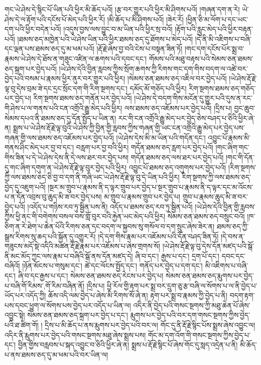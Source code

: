 གང་ཡེ་ཤེས་དེ་སྙིང་པོ་ཡིན་པའི་ཕྱིར་མི་ཆོད་པའོ། །རྩ་བར་གྱུར་པའི་ཕྱིར་མི་ཤིགས་པའོ། །གཞན་དག་ན་རེ། ཡེ་ཤེས་དེ་ལ་རྟོག་པའི་དངོས་པོ་མེད་པའི་ཕྱིར་རོ། །མི་ཆོད་པ་མི་ཤིགས་པའོ། །ཟེར་རོ། །ཕྱིན་ཅི་མ་ལོག་པ་དང་ཡང་དག་པའི་ཕྱིར་བདེན་པའོ། །འདུས་བྱས་ལས་བྱུང་བ་མ་ཡིན་པའི་ཕྱིར་སྲ་བའོ། །རྟོག་པའི་རླུང་མེད་པའི་ཕྱིར་བརྟན་པའོ། །ཐམས་ཅད་མཁྱེན་པའི་ཡེ་ཤེས་ཡིན་པའི་ཕྱིར་ཐམས་ཅད་དུ་ཐོགས་པ་མེད་པའོ། །དེ་ནི་མི་འཇིགས་པ་བཞི་དང་ལྡན་པས་ཐམས་ཅད་དུ་མ་ཕམ་པའོ། །རྡོ་རྗེ་ཞེས་བྱ་བའི་ངེས་པ་བསྟན་ཟིན་ཏོ། །གང་དག་དངོས་པོར་སྨྲ་བ་རྣམས་ཡེ་ཤེས་དེ་ཐོས་ན་གཟུང་འཛིན་ལ་ཆགས་པའི་དབང་དང་། གོམས་པའི་མཐུ་བརྟས་པའི་སེམས་ཅན་ཐམས་ཅད་སྐྲག་པར་བྱེད་པའོ། །ཡེ་ཤེས་དེའི་བྱིན་རླབས་ཀྱིས་སྲོག་ཆགས་ཀྱི་རིགས་གང་དག་གིས་བདག་ལ་འཚེ་བར་བྱེད་པའི་བསམ་པ་རྣམས་ཕྱིར་ནུར་བར་གྱུར་པའི་ཕྱིར། །སེམས་ཅན་ཐམས་ཅད་འཇིལ་བར་བྱེད་པའོ། །ཡེ་ཤེས་རྡོ་རྗེ་ལྟ་བུ་དེས་བྲམ་ཟེ་དང་དྲང་སྲོང་དག་གི་རིག་སྔགས་དང་། དམོད་མོ་གཅོད་པའི་ཕྱིར། རིག་སྔགས་ཐམས་ཅད་གཅོད་པར་བྱེད་པ། རིག་སྔགས་ཐམས་ཅད་གནོན་པར་བྱེད་པའོ། །ཡེ་ཤེས་དེ་བདག་གིས་མངོན་དུ་གྱུར་པའི་དུས་ན་རང་གི་ཤེས་པ་ལ་གནས་པའི་ངན་འགྲོའི་རྒྱུ་མེད་པའི་ཕྱིར། ལས་ཐམས་ཅད་འཇོམས་པར་བྱེད་པའོ། །དྲིས་པ། བྱང་ཆུབ་སེམས་དཔའ་ནི་ཐམས་ཅད་དུ་དོན་སྤྱོད་པ་ཡིན་ན། རང་གི་ངན་འགྲོའི་རྒྱུ་མེད་པར་བྱེད་ཅེས་བཤད་པ་ཅིའི་ཕྱིར་ཞེ་ན། སྨྲས་པ་ཡེ་ཤེས་རྡོ་རྗེ་ལྟ་བུའི་ཡེ་ཤེས་ཀྱི་བྱིན་གྱི་རླབས་ཀྱིས་གཞན་གྱི་ཡང་ངན་འགྲོའི་རྒྱུ་མེད་པར་བྱེད་པས་གཞན་གྱི་ལས་ཐམས་ཅད་འཇོམས་པར་བྱེད་པའོ། །ཡེ་ཤེས་དེས་མི་མ་ཡིན་པའི་གདོན་དང་། འབྱུང་པོ་རྣམས་མི་གནས་ཤིང་མེད་པར་བྱ་བ་དང་། བརླག་པར་བྱ་བའི་ཕྱིར། གདོན་ཐམས་ཅད་རླག་པར་བྱེད་པའོ། །གང་ཞིག་གང་གིས་ཟིན་པ་དེ་ཡེ་ཤེས་དེས་ནི་དེ་ལས་ཐར་བར་བྱེད་པས། གདོན་ཐམས་ཅད་ལས་ཐར་པར་བྱེད་པའོ། །གང་གི་དོན་དུ་གང་ཞིག་དགུག་ན་ཡེ་ཤེས་རྡོ་རྗེ་ལྟ་བུར་བྱེད་པའི་ཕྱིར། འབྱུང་པོ་ཐམས་ཅད་འགུགས་པར་བྱེད་པའོ། །རིག་སྔགས་ཀྱི་ལས་ཐམས་ཅད་ཅི་བྱ་བ་དག་ནི་གཞི་ཡང་ཡེ་ཤེས་རྡོ་རྗེ་ལྟ་བུ་དེ་ཡིན་པའི་ཕྱིར། རིག་སྔགས་ཀྱི་ལས་ཐམས་ཅད་བྱེད་དུ་འཇུག་པའོ། །སྔར་མ་གྲུབ་པ་རྣམས་ནི་ད་ལྟར་གྲུབ་པར་བྱེད་པ་སྔར་གྲུབ་པ་རྣམས་ནི་ད་ལྟར་དང་མ་འོངས་པ་ན་དོན་འབྲས་བུ་ཆུད་མི་ཟ་བར་བྱེད་པས། མ་གྲུབ་པ་རྣམས་གྲུབ་པར་བྱེད་པ། གྲུབ་པ་རྣམས་ཆུད་མི་ཟ་བར་བྱེད་པའོ། །འདོད་པ་གཉིས་རབ་ཏུ་སྦྱིན་པས་ནི། འདོད་པ་ཐམས་ཅད་རབ་ཏུ་སྦྱིན་པའོ། །ཡེ་ཤེས་དེའི་བྱིན་གྱི་རླབས་ཀྱིས་ཕྱི་ནང་གི་བགེགས་བསལ་བས་གློ་བུར་བའི་རྐྱེན་ཡང་མེད་པའི་ཕྱིར། སེམས་ཅན་ཐམས་ཅད་བསྲུང་བའོ། །ཁ་ཅིག་ན་རེ་ཐེག་པ་ཆེན་པོའི་རིགས་ཅན་དང་བདག་ལ་སྐྱབས་སུ་གསོལ་བ་དག་སྲུང་ཞེས་ཟེར་ན། ཐམས་ཅད་ཀྱི་སྒྲས་རིགས་སུ་ཆད་པའི་སྐྱོན་དུ་འགྱུར་རོ། །དེ་དག་གིས་རྣམ་པར་འཇོམས་པའི་དོན་བཤད་ཟིན་ཏོ། །དེ་བས་ན་གཟུངས་མདོ་སྡེ་འདིའི་མཚན་རྡོ་རྗེ་རྣམ་པར་འཇོམས་པ་ཞེས་གྲགས་སོ། །ཡེ་ཤེས་རྡོ་རྗེ་ལྟ་བུ་དེས་དོན་མཛད་པའི་སྒོ་ནི་མང་མོད་ཀྱང་ལས་རྣམ་པ་བཞིའི་སྒོ་ནས་དོན་མཛད་དེ། ཞི་བ་དང་། རྒྱས་པ་དང་། དྲག་པོ་དང་། དབང་དང་བཞིའོ། །ཉོན་མོངས་པ་གསུམ་དང་། ཚེ་དང་ལོངས་སྤྱོད་དང་། གནོད་པར་བྱེད་པ་དག་དང་། མི་འཇིགས་པ་བཞི་དང་། ཞི་བ་དང་རྒྱས་པ་དང་། སེམས་ཅན་ཐམས་ཅད་རེངས་པར་བྱེད་པ། སེམས་ཅན་ཐམས་ཅད་རྨུགས་པར་བྱེད་པ་བཞི་{གོ་རིམས་,གོ་རིམ་}བཞིན་ནོ། །དྲིས་པ། ཕྱི་རོལ་གྱི་རྟག་པར་སྨྲ་བར་དྲུག་ཅུ་རྩ་བཞི་ལ་སོགས་པ་ལ་ནི་བྱེད་པ་ཡོད་པར་འདོད་ཀྱི། ཆོས་འདི་ལམ་བྱེད་པ་ཞེས་མི་རིགས་སོ་ཞེ་ན། རྟག་པར་སྨྲ་བ་རྣམས་ཀྱི་བྱེད་པ་ནི། བདག་རྟག་པས་དབང་ཕྱུག་ལ་སོགས་པས་བྱེད་པར་འདོད་པ་ཡིན་ལ། འདིར་ནི་བྱེད་པའི་གསང་སྔགས་ཀྱི་མཐུ་ཆེན་པོ་ཞེས་འབྱུང་སྟེ། སེམས་ཅན་ཐམས་ཅད་སྐྲག་པར་བྱེད་པ་དང་། རྨུགས་པར་བྱེད་པའི་བར་དག་གསང་སྔགས་ཀྱིས་བྱེད་པའི་ཐ་ཚིག་གོ། །  དྲིས་པ་མི་ཆོད་པ་ནས་རྨུགས་པར་བྱེད་པའི་བར་ལ། གོང་དུ་ནི་རྡོ་རྗེ་སྙིང་པོས་སྨྲས་ཞེས་འབྱུང་ལ། འདིར་ནི་རྨུགས་པར་བྱེད་པའི་གསང་སྔགས་མཐུ་ཞེས་སྨྲས་པས། གོང་མ་དག་འོག་གི་གསང་སྔགས་ཀྱིས་བྱེད་པ་དང་། བྱིན་གྱིས་བརླབས་པ་སྐད་འབྱུང་བ་ཅིའི་ཕྱིར་ཞེ་ན། སྨྲས་པ་རྡོ་རྗེ་སྙིང་པོ་ཞེས་གོང་དུ་སླད་འདྲེན་པ་ནི། མི་ཆོད་པ་ནས་ཐམས་ཅད་དུ་མ་ཕམ་པའི་བར་ཡིན་ལ། 